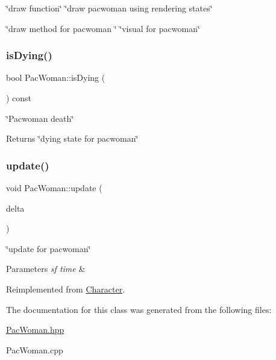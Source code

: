 \char`\"{}draw function\char`\"{}  \char`\"{}draw pacwoman using rendering states\char`\"{} 

\char`\"{}draw method for pacwoman \char`\"{}  \char`\"{}visual for pacwoman\char`\"{} \mbox{\label{classPacWoman_acbd14fdccea1d7d02e91327f0a659979}} 
\subsubsection{\texorpdfstring{is\+Dying()}{isDying()}}
{\footnotesize\ttfamily bool Pac\+Woman\+::is\+Dying (\begin{DoxyParamCaption}{ }\end{DoxyParamCaption}) const}



\char`\"{}\+Pacwoman death\char`\"{} 

\begin{DoxyReturn}{Returns}
\char`\"{}dying state for pacwoman\char`\"{} 
\end{DoxyReturn}
\mbox{\label{classPacWoman_a82b822a1b09b749568031b76f62ddae7}} 
\subsubsection{\texorpdfstring{update()}{update()}}
{\footnotesize\ttfamily void Pac\+Woman\+::update (\begin{DoxyParamCaption}\item[{sf\+::\+Time}]{delta }\end{DoxyParamCaption})\hspace{0.3cm}{\ttfamily [virtual]}}



\char`\"{}update for pacwoman\char`\"{} 


\begin{DoxyParams}{Parameters}
{\em sf time} & \\
\hline
\end{DoxyParams}


Reimplemented from \hyperlink{classCharacter_a9d20989cb4d1c826f98f9d6f7c9f63a6}{Character}.



The documentation for this class was generated from the following files\+:\begin{DoxyCompactItemize}
\item 
\hyperlink{PacWoman_8hpp}{Pac\+Woman.\+hpp}\item 
Pac\+Woman.\+cpp\end{DoxyCompactItemize}
